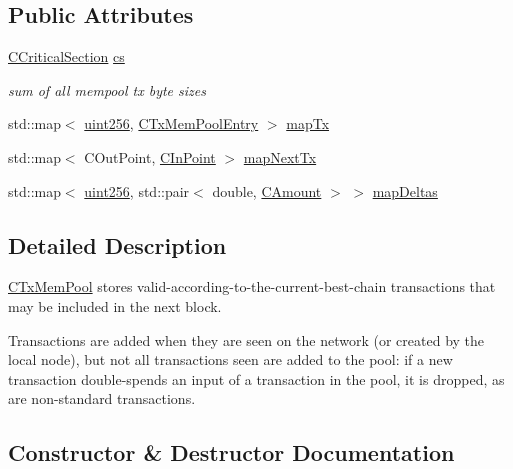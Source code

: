 \subsection*{Public Attributes}
\begin{DoxyCompactItemize}
\item 
\hyperlink{sync_8h_a37a4692b2d517f2843655ca11af7668a}{C\+Critical\+Section} \hyperlink{class_c_tx_mem_pool_ac7ee8c06837c7d2688e2d7e3d071bdbb}{cs}
\begin{DoxyCompactList}\small\item\em sum of all mempool tx\textquotesingle{} byte sizes \end{DoxyCompactList}\item 
std\+::map$<$ \hyperlink{classuint256}{uint256}, \hyperlink{class_c_tx_mem_pool_entry}{C\+Tx\+Mem\+Pool\+Entry} $>$ \hyperlink{class_c_tx_mem_pool_a5cd374a559b02a6485ca8cef769f9930}{map\+Tx}
\item 
std\+::map$<$ C\+Out\+Point, \hyperlink{class_c_in_point}{C\+In\+Point} $>$ \hyperlink{class_c_tx_mem_pool_aae6f1162f0b2e42b369971f32a9f71e8}{map\+Next\+Tx}
\item 
std\+::map$<$ \hyperlink{classuint256}{uint256}, std\+::pair$<$ double, \hyperlink{amount_8h_a4eaf3a5239714d8c45b851527f7cb564}{C\+Amount} $>$ $>$ \hyperlink{class_c_tx_mem_pool_a341709e31a39ce7a7a951a85c775c589}{map\+Deltas}
\end{DoxyCompactItemize}


\subsection{Detailed Description}
\hyperlink{class_c_tx_mem_pool}{C\+Tx\+Mem\+Pool} stores valid-\/according-\/to-\/the-\/current-\/best-\/chain transactions that may be included in the next block.

Transactions are added when they are seen on the network (or created by the local node), but not all transactions seen are added to the pool\+: if a new transaction double-\/spends an input of a transaction in the pool, it is dropped, as are non-\/standard transactions. 

\subsection{Constructor \& Destructor Documentation}
\hypertarget{class_c_tx_mem_pool_a82147548cfa962975690d1926b717c1c}{}
